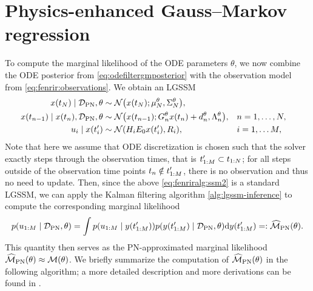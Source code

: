 \documentclass{mimosis}
\begin{document}
\section{Physics-enhanced Gauss--Markov regression}
\label{sec:orgbab7b86}
To compute the marginal likelihood of the ODE parameters \(\theta\), we now combine the ODE posterior from \cref{eq:odefiltergmposterior} with the observation model from \cref{eq:fenrir:observations}.
We obtain an LGSSM
\begin{subequations}
\label{eq:fenriralg:ssm2}
\begin{align}
  \st(t_N) \mid \data_\text{PN}, \theta &\sim \N( \st(t_N); \mean{N}^\theta, \cov{N}^\theta ), \\
  \st(t_{n-1}) \mid \st(t_n), \data_\text{PN}, \theta &\sim \N( \st(t_{n-1}); \invtransA_n^\theta \st(t_n) + \invtransb_n^\theta, \invtransC_n^\theta ), && n = 1, \dots, \numtimes, \\
  \oobs_i \mid \st(t_i') &\sim \N( \obsA_i \proj{0} \st(t_i'), \obsC_i ), && i = 1, \dots \numdata,
\end{align}
\end{subequations}
Note that here we assume that ODE discretization is chosen such that the solver exactly steps through the observation times, that is
\(t_{1:M}' \subset t_{1:N}\);
for all steps outside of the observation time points \(t_n \notin t_{1:M}'\), there is no observation and thus no need to update.
Then, since the above \cref{eq:fenriralg:ssm2} is a standard LGSSM, we can apply
the Kalman filtering algorithm \ref{alg:lgssm-inference}
to compute the corresponding marginal likelihood
\begin{equation}
  \p(\oobs_{1:M} \mid \data_\text{PN},\theta) =
  \int
    \p(\oobs_{1:M} \mid \val(t_{1:M}'))
    \p(\val(t_{1:M}') \mid \data_\text{PN},\theta)
  \dd \val(t_{1:M}')
  =: \PNML(\theta).
\end{equation}
This quantity then serves as the PN-approximated marginal likelihood
\(\widehat{\mathcal{M}}_\text{PN}(\theta) \approx \mathcal{M}(\theta)\).
We briefly summarize the computation of \(\widehat{\mathcal{M}}_\text{PN}(\theta)\) in the following algorithm;
a more detailed description and more derivations can be found in
\fenrir{}.
\end{document}

